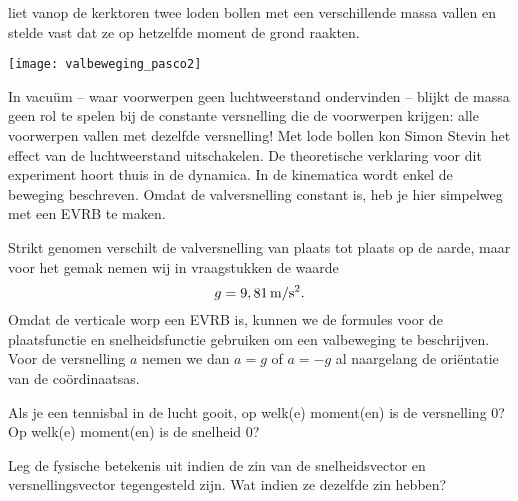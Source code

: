 \documentclass{ximera}
\begin{document}
 liet vanop de kerktoren twee loden bollen met een verschillende massa vallen en stelde vast dat ze op hetzelfde moment de grond raakten.
 

 \begin{image}
 
 \texttt{[image: valbeweging\_pasco2]}
 \end{image}

In vacuüm -- waar voorwerpen geen luchtweerstand ondervinden -- blijkt de massa geen rol te spelen bij de constante versnelling die de voorwerpen krijgen: alle voorwerpen vallen met dezelfde versnelling! 
Met lode bollen kon Simon Stevin het effect van de luchtweerstand uitschakelen. 
De theoretische verklaring voor dit experiment hoort thuis in de dynamica. 
In de kinematica wordt enkel de beweging beschreven. 
Omdat de valversnelling constant is, heb je hier simpelweg met een EVRB te maken.

Strikt genomen verschilt de valversnelling van plaats tot plaats op de aarde, maar voor het gemak nemen wij in vraagstukken de waarde
\[g=9,81\rm\,m/s^2.\]
Omdat de verticale worp een EVRB is, kunnen we de formules voor de plaatsfunctie en snelheidsfunctie gebruiken om een valbeweging te beschrijven. 
Voor de versnelling $a$ nemen we dan $a=g$ of $a=-g$ al naargelang de oriëntatie van de coördinaatsas.

\begin{quickquestion*}{}{}
Als je een tennisbal in de lucht gooit, op welk(e) moment(en) is de versnelling \(0\)? Op welk(e) moment(en) is de snelheid \(0\)? 
\end{quickquestion*}

\begin{quickquestion*}{}{}
Leg de fysische betekenis uit indien de zin van de snelheidsvector en versnellingsvector tegengesteld zijn. Wat indien ze dezelfde zin hebben?
\end{quickquestion*}
\end{document}
